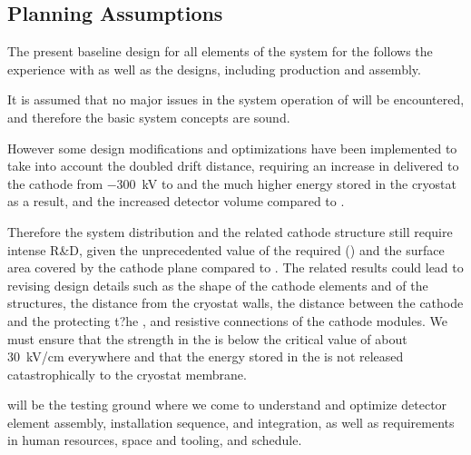 \subsection{Planning Assumptions}
\label{sec:fddp-hv-org-assmp}

The present baseline design for all elements of the  system for the  follows the experience with  as well as the  designs, including production and assembly.  

It is %
assumed that no major issues in the  system operation of  will be encountered, and therefore the basic  system concepts are sound.

However some design modifications and optimizations have been implemented to take into account the %
doubled drift distance, requiring an increase in  delivered to the cathode from \SI{-300}{\kV} to \dptargetdriftvoltneg{} and the much higher energy stored in the cryostat as a result, %
and the increased detector volume compared to .

Therefore the   system distribution and the related cathode structure still require intense R\&D, given the unprecedented value of the required  (\dptargetdriftvoltneg) and the surface area covered by the cathode plane compared to . 
The related results could lead to revising design details such as the shape of the cathode elements and of the %
 structures, the distance from the cryostat walls, the distance between the cathode and the %
 protecting t?he , and resistive connections of the cathode modules. We must ensure that the \efield strength in the  is below the critical value of  about \SI{30}{\kV/\cm} everywhere and that the energy stored in the  is not released catastrophically to the cryostat membrane. 

 will be the testing ground where we come to understand and optimize detector element assembly, installation sequence, and integration, as well as requirements in human resources, space and tooling, and schedule. 



